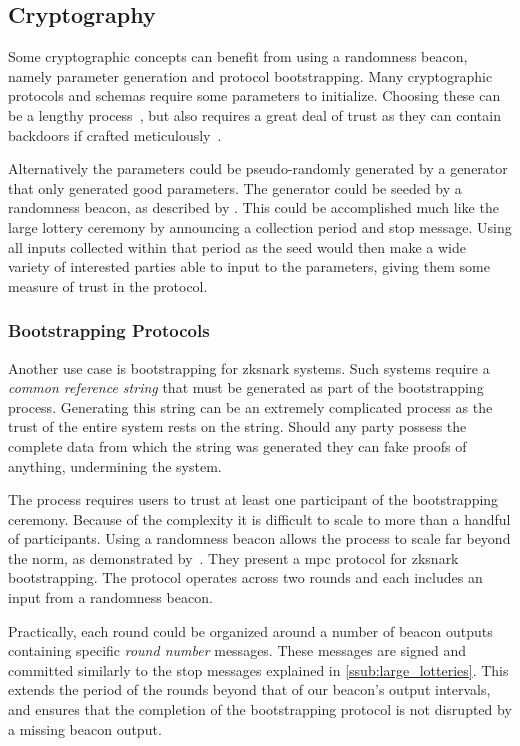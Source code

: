 \subsection{Cryptography}
Some cryptographic concepts can benefit from using a randomness beacon, namely parameter generation and protocol bootstrapping.
Many cryptographic protocols and schemas require some parameters to initialize.
Choosing these can be a lengthy process~\cite{mpcsnarks}, but also requires a great deal of trust as they can contain backdoors if crafted meticulously~\cite{nist2014backdoor}.

Alternatively the parameters could be pseudo-randomly generated by a generator that only generated good parameters.
The generator could be seeded by a randomness beacon, as described by \citet{baigneres2015trap}.
This could be accomplished much like the large lottery ceremony by announcing a collection period and stop message.
Using all inputs collected within that period as the seed would then make a wide variety of interested parties able to input to the parameters, giving them some measure of trust in the protocol.

\subsubsection{Bootstrapping Protocols}%
\label{ssub:bootstrapping_protocols}
Another use case is bootstrapping for \gls{zksnark} systems.
Such systems require a \emph{common reference string} that must be generated as part of the bootstrapping process.
Generating this string can be an extremely complicated process as the trust of the entire system rests on the string.
Should any party possess the complete data from which the string was generated they can fake proofs of anything, undermining the system.

The process requires users to trust at least one participant of the bootstrapping ceremony.
Because of the complexity it is difficult to scale to more than a handful of participants.
Using a randomness beacon allows the process to scale far beyond the norm, as demonstrated by~\citet{mpcsnarks}.
They present a \acrshort{mpc} protocol for \acrshort{zksnark} bootstrapping.
The protocol operates across two rounds and each includes an input from a randomness beacon. %

Practically, each round could be organized around a number of beacon outputs containing specific \textit{round number} messages.
These messages are signed and committed similarly to the stop messages explained in \cref{ssub:large_lotteries}.
This extends the period of the rounds beyond that of our beacon's output intervals, and ensures that the completion of the bootstrapping protocol is not disrupted by a missing beacon output.
